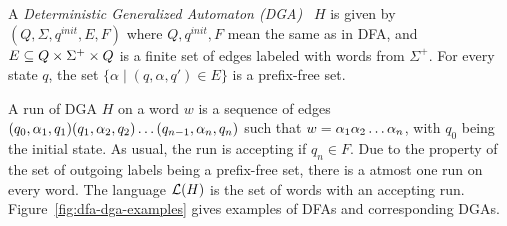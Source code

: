 \begin{definition} \label{def:dga}
  A \emph{Deterministic Generalized Automaton (DGA)}~\cite{giammarresi1999deterministic} $H$ is given by
  $(Q, \Sigma, q^{init}, E, F)$ where $Q, q^{init}, F$ mean the same
  as in DFA, and $E \subseteq Q \times \Sigma^+ \times Q$ is a finite set
  of edges labeled with words from $\Sigma^+$. For every state $q$,
  the set $\{ \alpha \mid (q, \alpha, q') \in E \}$ is a prefix-free
  set.
\end{definition}
A run of DGA $H$ on a word $w$ is a sequence of edges
$(q_0, \alpha_1, q_1) (q_1, \alpha_2, q_2) \dots (q_{n-1}, \alpha_n, q_n)$
such that $w = \alpha_1 \alpha_2 \dots \alpha_n$, with $q_0$ being the
initial state. As usual, the run is accepting if $q_n \in F$. Due to
the property of the set of outgoing labels being a prefix-free set,
there is a atmost one run on every word. The language $\mathcal{L}(H)$ is the
set of words with an accepting run. Figure~\ref{fig:dfa-dga-examples}
gives examples of DFAs and corresponding DGAs.


